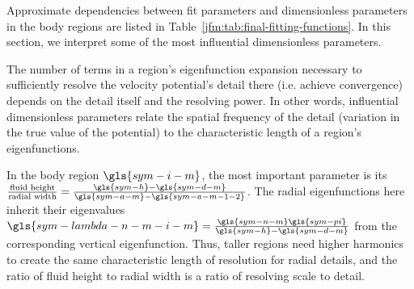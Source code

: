 \documentclass[lineno]{JFM-FLM_Au}
\begin{document}
\begin{table}
    \caption{Dependency trends on individual dimensionless parameter identified/used for fitting error predictions in body regions, based on the procedure in Fig.~\ref{jfm:fig:choosing-fitting-functions}. 
    The constants $\gls{sym-c-i} \geq 0$ in each box are placeholders and not intended have the same value between boxes. 
    Damping nearly always converges faster than added mass in the interior regions ($\gls{sym-m-region}<\gls{sym-M-regions}$), so the associated fit parameters ($\gls{sym-alpha-B-i-m}$, $\gls{sym-beta-B-i-m}$) were not \analysed{}. 
    The choice of the piecewise form of $\gls{sym-beta-B-i-M}(\gls{sym-lambda-0-e}\gls{sym-h})$ is out of practicality for fitting: 
    to capture the clear $\gls{sym-beta-B-i-M} \propto \sqrt{\gls{sym-lambda-0-e} \gls{sym-h}}$ relation at high $\gls{sym-lambda-0-e} \gls{sym-h}$ while approximating the different \behaviour{} near zero.
    }
    \label{jfm:tab:final-fitting-functions}\end{table}
Approximate dependencies between fit parameters and dimensionless parameters in the body regions are listed in Table~\ref{jfm:tab:final-fitting-functions}.
In this section, we interpret some of the most influential dimensionless parameters.

The number of terms in a region's eigenfunction expansion necessary to sufficiently resolve the velocity potential's detail there (i.e. achieve convergence) depends on the detail itself and the resolving power.
In other words, influential dimensionless parameters relate the spatial frequency of the detail (variation in the true value of the potential) to the characteristic length of a region's eigenfunctions.

In the body region $\gls{sym-i-m}$, the most important parameter is its $\frac{\text{fluid height}}{\text{radial width}} = \frac{\gls{sym-h} - \gls{sym-d-m}}{\gls{sym-a-m} - \gls{sym-a-m-1-2}}$.
The radial eigenfunctions here inherit their eigenvalues $\gls{sym-lambda-n-m-i-m} = \frac{\gls{sym-n-m}\gls{sym-pi}}{\gls{sym-h}-\gls{sym-d-m}}$ from the corresponding vertical eigenfunction.
Thus, taller regions need higher harmonics to create the same characteristic length of resolution for radial details, and the ratio of fluid height to radial width is a ratio of resolving scale to detail.
\end{document}
